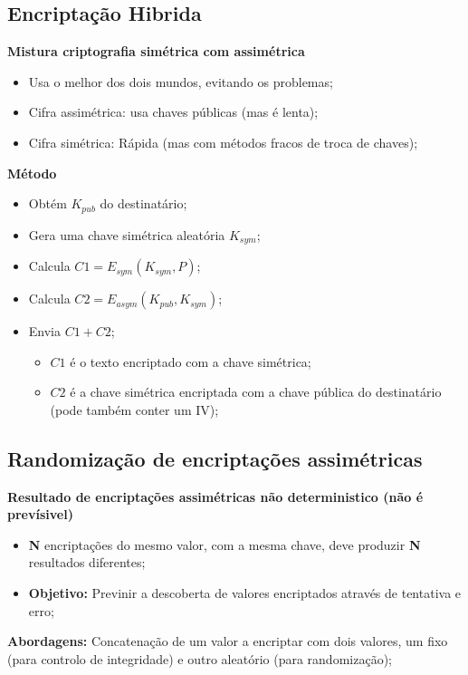 \documentclass{article}
\begin{document}
\subsection{Encriptação Hibrida}

\begin{flushleft}
  \textbf{Mistura criptografia simétrica com assimétrica}
  \begin{itemize}
    \item Usa o melhor dos dois mundos, evitando os problemas;
    \item Cifra assimétrica: usa chaves públicas (mas é lenta);
    \item Cifra simétrica: Rápida (mas com métodos fracos de troca de chaves);
  \end{itemize}

  \vspace{2mm}

  \textbf{Método}
  \begin{itemize}
    \item Obtém \textbf{$K_{pub}$} do destinatário;
    \item Gera uma chave simétrica aleatória \textbf{$K_{sym}$};
    \item Calcula \textbf{$C1 = E_{sym}(K_{sym}, P)$};
    \item Calcula \textbf{$C2 = E_{asym}(K_{pub}, K_{sym})$};
    \item Envia \textbf{$C1 + C2$};
    \begin{itemize}
      \item $C1$ é o texto encriptado com a chave simétrica;
      \item $C2$ é a chave simétrica encriptada com a chave pública do destinatário (pode também conter um IV);
    \end{itemize}
  \end{itemize}
\end{flushleft}

\subsection{Randomização de encriptações assimétricas}

\begin{flushleft}
  \textbf{Resultado de encriptações assimétricas não deterministico (não é prevísivel)}
  \begin{itemize}
    \item \textbf{N} encriptações do mesmo valor, com a mesma chave, deve produzir \textbf{N} resultados diferentes;
    \item \textbf{Objetivo:} Previnir a descoberta de valores encriptados através de tentativa e erro;
  \end{itemize}

  \vspace{2mm}

  \textbf{Abordagens:} Concatenação de um valor a encriptar com dois valores,
  um fixo (para controlo de integridade) e outro aleatório (para randomização);
\end{flushleft}
\end{document}
